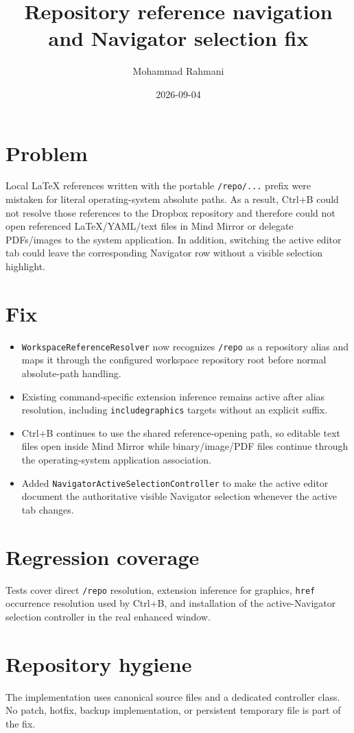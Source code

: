 \documentclass[a4paper]{article}
\title{Repository reference navigation and Navigator selection fix}
\date{2026-09-04}
\author{Mohammad Rahmani}
\begin{document}
\maketitle

\section{Problem}
Local LaTeX references written with the portable \texttt{/repo/...} prefix were
mistaken for literal operating-system absolute paths. As a result, Ctrl+B could
not resolve those references to the Dropbox repository and therefore could not
open referenced LaTeX/YAML/text files in Mind Mirror or delegate PDFs/images to
the system application. In addition, switching the active editor tab could leave
the corresponding Navigator row without a visible selection highlight.

\section{Fix}
\begin{itemize}
   \item \texttt{WorkspaceReferenceResolver} now recognizes \texttt{/repo} as a repository alias and maps it through the configured workspace repository root before normal absolute-path handling.
   \item Existing command-specific extension inference remains active after alias resolution, including \texttt{includegraphics} targets without an explicit suffix.
   \item Ctrl+B continues to use the shared reference-opening path, so editable text files open inside Mind Mirror while binary/image/PDF files continue through the operating-system application association.
   \item Added \texttt{NavigatorActiveSelectionController} to make the active editor document the authoritative visible Navigator selection whenever the active tab changes.
\end{itemize}

\section{Regression coverage}
Tests cover direct \texttt{/repo} resolution, extension inference for graphics,
\texttt{href} occurrence resolution used by Ctrl+B, and installation of the
active-Navigator selection controller in the real enhanced window.

\section{Repository hygiene}
The implementation uses canonical source files and a dedicated controller class.
No patch, hotfix, backup implementation, or persistent temporary file is part of
the fix.
\end{document}
